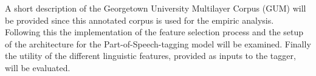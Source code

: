 A short description of the Georgetown University Multilayer Corpus (GUM) will be provided since this annotated corpus is used for the empiric analysis. 
Following this the implementation of the feature selection process and the setup of the architecture for  the Part-of-Speech-tagging model will be examined. Finally the utility of the different linguistic features, provided as inputs to the tagger, will be evaluated.
